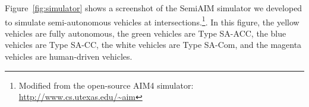 Figure~\ref{fig:simulator} shows a screenshot of the SemiAIM simulator
we developed to simulate semi-autonomous vehicles at
intersections.\footnote{Modified from the open-source AIM4 simulator:
\url{http://www.cs.utexas.edu/~aim}}.  In this figure, the yellow
vehicles are fully autonomous, the green vehicles are Type SA-ACC, the
blue vehicles are Type SA-CC, the white vehicles are Type SA-Com, and
the magenta vehicles are human-driven vehicles.









